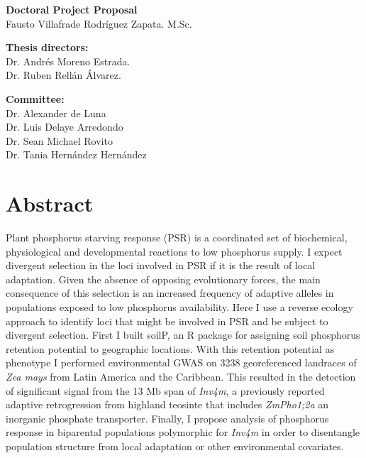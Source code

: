 \documentclass[10pt,letterpaper]{article}
\begin{document}
\vspace*{0.35in}

\begin{flushleft}
{\Large
\textbf{
}
}
\bigskip

\textbf{Doctoral Project Proposal} \\
Fausto Villafrade Rodríguez Zapata. M.Sc. 
\bigskip

\textbf{Thesis directors:} \\
Dr. Andrés Moreno Estrada.\\
Dr. Ruben Rellán Álvarez.

\bigskip
\textbf{Committee:}\\
Dr. Alexander de Luna \\
Dr. Luis Delaye Arredondo \\
Dr. Sean Michael Rovito  \\
Dr. Tania Hernández Hernández
\end{flushleft}

\section*{Abstract}
Plant phosphorus starving response (PSR) is a coordinated set of biochemical, physiological and developmental reactions to low phosphorus supply. I expect divergent selection in the loci involved in PSR if it is the result of local adaptation. Given the absence of opposing evolutionary forces, the main consequence of this selection is an increased frequency of adaptive alleles in populations exposed to low phosphorus availability. Here I use a reverse ecology approach to identify loci that might be involved in PSR and be subject to divergent selection. First I built soilP, an R package for assigning soil phosphorus retention potential to geographic locations. With this retention potential as phenotype I performed environmental GWAS on 3238 georeferenced landraces of \textit{Zea mays} from Latin America and the Caribbean. This resulted in the detection of significant signal from the 13 Mb span of \textit{Inv4m}, a previously reported adaptive retrogression from highland teosinte that includes \textit{ZmPho1;2a} an inorganic phosphate transporter. Finally, I propose analysis of phosphorus response in biparental populations polymorphic for \textit{Inv4m} in order to disentangle population structure from local adaptation or other environmental covariates.
\end{document}
